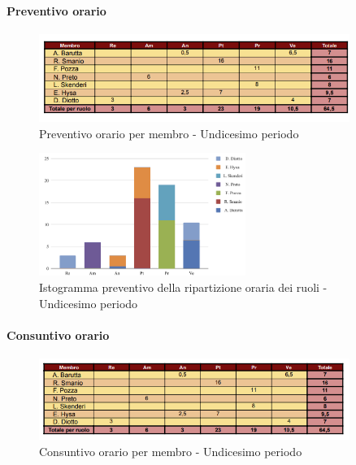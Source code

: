 \paragraph{Preventivo orario}

\begin{figure}[H] 
    \centering
    \includegraphics[width=0.9\textwidth]{../Images/tabPrev11.png}
    \caption{Preventivo orario per membro - Undicesimo periodo}
    \label{fig:Preventivo_orario_11}
\end{figure}

\begin{figure}[H]
    \centering
    \includegraphics[width=0.6\textwidth]{../Images/graficoConsPrev11.png}
    \caption{Istogramma preventivo della ripartizione oraria dei ruoli - Undicesimo periodo}
    \label{fig:Preventivo_ripartizione_oraria_11}
\end{figure}

\paragraph{Consuntivo orario}

\begin{figure}[H]
    \centering
    \includegraphics[width=0.9\textwidth]{../Images/tabCons11.png}
    \caption{Consuntivo orario per membro - Undicesimo periodo}
    \label{fig:Constuntivo_orario_11}
\end{figure}

